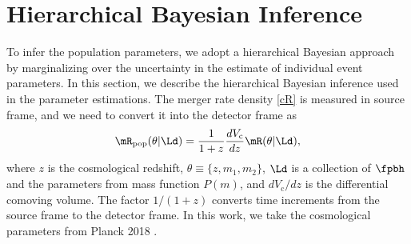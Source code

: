 \documentclass[twocolumn]{aastex631}
\def\e{\begin{equation}}
\def\q{\end{equation}}
\begin{document}
\section{\label{method}Hierarchical Bayesian Inference}
To infer the population parameters, we adopt a hierarchical Bayesian approach by marginalizing over the uncertainty in the estimate of individual event parameters.
In this section, we describe the hierarchical Bayesian inference used in the parameter estimations.
The merger rate density \eqref{cR} is measured in source frame, and we need to convert it into the detector frame as
\e\label{Rpop}
\mR_{\mathrm{pop}}(\theta|\Ld) = \frac{1}{1+z} \frac{dV_\mathrm{c}}{dz} \mR(\theta|\Ld),
\q
where $z$ is the cosmological redshift, $\theta\equiv\{z, m_1, m_2\}$, $\Ld$ is a collection of $\fpbh$ and the parameters from mass function $P(m)$, and $dV_\mathrm{c}/dz$ is the differential comoving volume. The factor $1/(1 + z)$ converts time increments from the source frame to the detector frame. In this work, we take the cosmological parameters from Planck 2018 \citep{Planck:2018vyg}.
\end{document}
